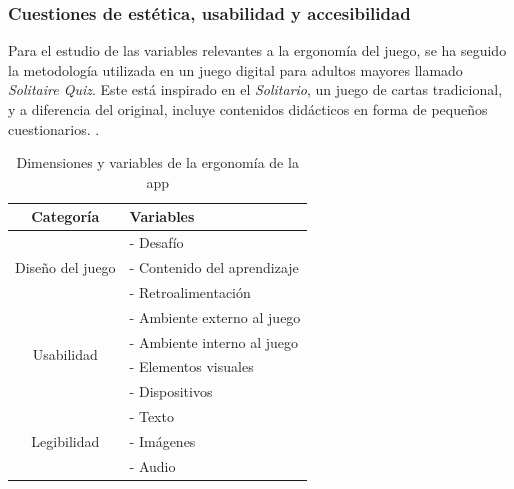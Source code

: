 \subsubsection{Cuestiones de estética, usabilidad y accesibilidad}

Para el estudio de las variables relevantes a la ergonomía del juego, se ha seguido la metodología utilizada en un juego digital para adultos mayores llamado \textit{Solitaire Quiz}. Este está inspirado en el \textit{Solitario}, un juego de cartas tradicional, y a diferencia del original, incluye contenidos didácticos en forma de pequeños cuestionarios. \parencite{diseño2017}.

\begin{table}[H]
	\centering
	\begin{tabular}{|c|p{6cm}|}
		\hline
		\rowcolor{lightgray}
		\textbf{Categoría} & \textbf{Variables}\\
		\hline
		\multirow{3}{*}{Diseño del juego} & - Desafío \\
		& - Contenido del aprendizaje \\
		& - Retroalimentación \\
		\hline
		\multirow{4}{*}{Usabilidad} & - Ambiente externo al juego \\
		& - Ambiente interno al juego \\
		& - Elementos visuales \\
		& - Dispositivos \\
		\hline
		\multirow{3}{*}{Legibilidad} & - Texto \\
		& - Imágenes \\
		& - Audio \\
		\hline
	\end{tabular}
	\caption{Dimensiones y variables de la ergonomía de la app}
	\label{tab:usabilidad}
\end{table}



